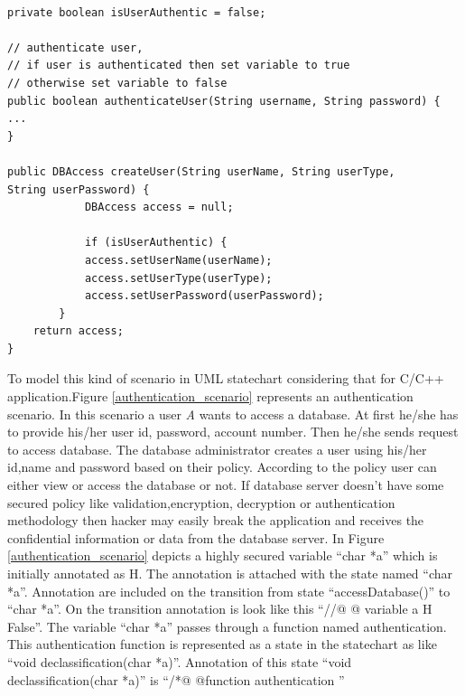 \begin{lstlisting}

private boolean isUserAuthentic = false;

// authenticate user,
// if user is authenticated then set variable to true
// otherwise set variable to false
public boolean authenticateUser(String username, String password) {
...
}

public DBAccess createUser(String userName, String userType,
String userPassword) {
			DBAccess access = null;
			
			if (isUserAuthentic) {
			access.setUserName(userName);
			access.setUserType(userType);
			access.setUserPassword(userPassword);
		}
	return access;
}
\end{lstlisting}

To model this kind of scenario in UML statechart considering that for C/C++ application.Figure \ref{authentication_scenario}  represents an authentication scenario. In this scenario a user \emph{A} wants to access a database. At first he/she has to provide his/her user id, password, account number. Then he/she sends request to access database. The database administrator creates a user using his/her id,name and password based on their policy. According to the policy user can either view or access the database or not. If database server doesn't have some secured policy like validation,encryption, decryption or authentication methodology then hacker may easily break the application and receives the confidential information or data from the database server. In Figure \ref{authentication_scenario} depicts a highly secured variable \enquote{char *a} which is initially annotated as H. The annotation is attached with the state named \enquote{char *a}. Annotation are included on the transition from state \enquote{accessDatabase()} to \enquote{char *a}. On the transition annotation is look like this \enquote{//@ @ variable a H False}. The variable \enquote{char *a} passes through a function named authentication. This authentication function is represented as a state in the statechart as like \enquote{void declassification(char *a)}. Annotation of this state \enquote{void declassification(char *a)} is \enquote{/*@ @function authentication
}

